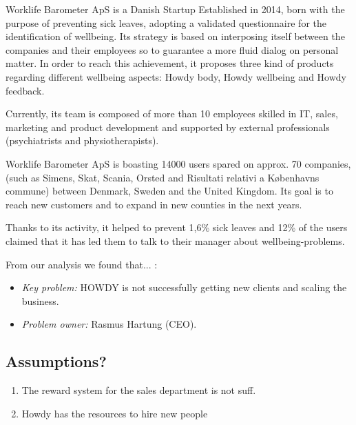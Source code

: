 


Worklife Barometer ApS is a Danish Startup Established in 2014, born with the purpose of preventing sick leaves, adopting a validated questionnaire for the identification of wellbeing. Its strategy is based on interposing itself between the companies and their employees so to guarantee a more fluid dialog on personal matter.     
In order to reach this achievement, it proposes three kind of products regarding different wellbeing aspects: Howdy body, Howdy wellbeing and Howdy feedback. 
 
Currently, its team is composed of more than 10 employees skilled in IT, sales, marketing and product development and supported by external professionals (psychiatrists and physiotherapists).

Worklife Barometer ApS is boasting 14000 users spared on approx. 70 companies, (such as Simens, Skat, Scania, Orsted and Risultati relativi a Københavns commune) between Denmark, Sweden and the United Kingdom. Its goal is to reach new customers and to expand in new counties in the next years.

Thanks to its activity, it helped to prevent 1,6\% sick leaves and 12\% of the users claimed that it has led them to talk to their manager about wellbeing-problems.   

\noindent From our analysis we found that... :
\begin{itemize}
    \item \textit{Key problem:} HOWDY is not successfully getting new clients and scaling the business.
    \item \textit{Problem owner:} Rasmus Hartung (CEO).
\end{itemize}



\subsection{Assumptions?}

\begin{enumerate}
    \item The reward system for the sales department is not suff.
    \item Howdy has the resources to hire new people 
\end{enumerate}


